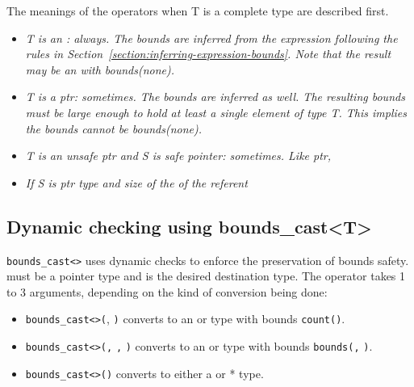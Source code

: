 The meanings of the operators when T is a complete type are described
first.

\begin{quote}
\end{quote}

\begin{itemize}
\item
  \it{T is an \arrayptr: always. The bounds are inferred from the
  expression following the rules in Section~\ref{section:inferring-expression-bounds}.
   Note that the result may
  be an \arrayptr with bounds(none).}
\item
  \it{T is a ptr: sometimes. The bounds are inferred as well. The
  resulting bounds must be large enough to hold at least a single
  element of type T. This implies the bounds cannot be bounds(none).}
\item
  \it{T is an unsafe ptr and S is safe pointer: sometimes. Like ptr, }
    \item
    \it{If S is ptr type and size of the of the referent }
\end{itemize}

\subsection{Dynamic checking using bounds\_cast\textless{}T\textgreater{}}

\texttt{bounds\_cast\textless{}}\texttt{\textgreater{}} uses
dynamic checks to enforce the preservation of bounds safety. 
must be a pointer type and is the desired destination type. The operator
takes 1 to 3 arguments, depending on the kind of conversion being done:

\begin{itemize}
\item
  \texttt{bounds\_cast\textless{}}\texttt{\textgreater{}(},
  \texttt{)} converts  to an \arrayptr or
  \arrayview type with bounds
  \texttt{count(}\texttt{)}.
\item
  \texttt{bounds\_cast\textless{}}\texttt{\textgreater{}(}\texttt{,}
  \texttt{,} \texttt{)} converts  to an
  \arrayptr or \arrayview type with bounds
  \texttt{bounds(}\texttt{,} \texttt{)}.
\item
  \texttt{bounds\_cast\textless{}}\texttt{\textgreater{}(}\texttt{)}
  converts  to either a \ptr or * type.
\end{itemize}

